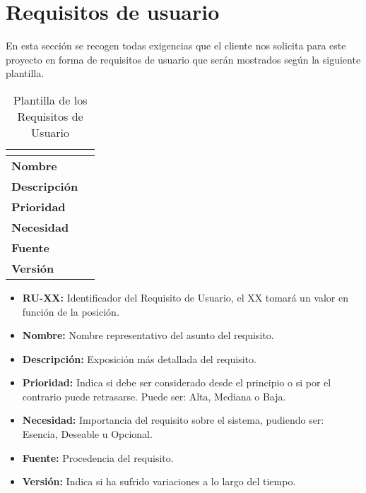 \section{Requisitos de usuario}
En esta sección se recogen todas exigencias que el cliente nos solicita para este proyecto en forma de requisitos de usuario que serán mostrados según la siguiente plantilla.
\begin{table}[H]
	\centering
	\caption{Plantilla de los Requisitos de Usuario}
	\begin{tabular}{|l|p{}|}
		\hline
		\multicolumn{2}{|c|}{\cellcolor[HTML]{BFBFBF}{\color[HTML]{000000} \textbf{RU-XX}}} \\ \hline
		\textbf{Nombre}      &   \\ \hline
		\textbf{Descripción} &   \\ \hline
		\textbf{Prioridad}   &   \\ \hline
		\textbf{Necesidad}   &   \\ \hline
		\textbf{Fuente}      &   \\ \hline
		\textbf{Versión}     &   \\ \hline
	\end{tabular}
\end{table}
\begin{itemize}
	\item \textbf{RU-XX:} Identificador del Requisito de Usuario, el XX tomará un valor en función de la posición.
	\item \textbf{Nombre:} Nombre representativo del asunto del requisito.
	\item \textbf{Descripción:} Exposición más detallada del requisito.
	\item \textbf{Prioridad:} Indica si debe ser considerado desde el principio o si por el contrario puede retrasarse. Puede ser: Alta, Mediana o Baja.
	\item \textbf{Necesidad:} Importancia del requisito sobre el sistema, pudiendo ser: Esencia, Deseable u Opcional.
	\item \textbf{Fuente:} Procedencia del requisito.
	\item \textbf{Versión:} Indica si ha sufrido variaciones a lo largo del tiempo.
\end{itemize}

